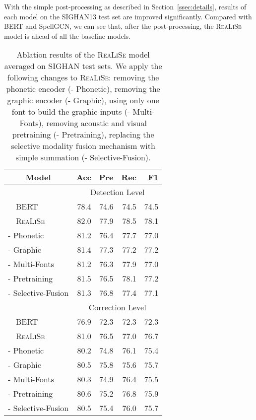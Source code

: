 \documentclass[11pt,a4paper]{article}
\newcommand\model{\textsc{ReaLiSe}}
\begin{document}
\begin{CJK*}{UTF8}{gbsn}

With the simple post-processing as described in Section~\ref{ssec:details}, results of each model on the SIGHAN13 test set are improved significantly. Compared with BERT and SpellGCN, we can see that, after the post-processing, the \model{} model is ahead of all the baseline models.

\end{CJK*}



\begin{table}[t]
\small
\centering

\begin{tabular}{@{}l|rrrr@{}}
\toprule
\multicolumn{1}{c|}{Model} & Acc & Pre & Rec & F1 \\
\midrule
& \multicolumn{4}{c}{Detection Level} \\
\midrule
~~BERT & 78.4 & 74.6 & 74.5 & 74.5 \\
~~\model{} & 82.0 & 77.9 & 78.5 & 78.1 \\
\quad - Phonetic & 81.2 & 76.4 & 77.7 & 77.0 \\
\quad - Graphic & 81.4 & 77.3 & 77.2 & 77.2 \\
\quad - Multi-Fonts & 81.2 & 76.3 & 77.9 & 77.0 \\
\quad - Pretraining & 81.5 & 76.5 & 78.1 & 77.2 \\
\quad - Selective-Fusion & 81.3 & 76.8 & 77.4 & 77.1 \\ 
\midrule
& \multicolumn{4}{c}{Correction Level} \\
\midrule
~~BERT & 76.9 & 72.3 & 72.3 & 72.3 \\
~~\model{} & 81.0 & 76.5 & 77.0 & 76.7 \\
\quad - Phonetic & 80.2 & 74.8 & 76.1 & 75.4 \\
\quad - Graphic & 80.5 & 75.8 & 75.6 & 75.7 \\
\quad - Multi-Fonts & 80.3 & 74.9 & 76.4 & 75.5 \\
\quad - Pretraining & 80.6 & 75.2 & 76.8 & 75.9 \\
\quad - Selective-Fusion & 80.5 & 75.4 & 76.0 & 75.7 \\ 
\bottomrule
\end{tabular}

\caption{Ablation results of the \model{} model averaged on SIGHAN test sets. We apply the following changes to \model{}: removing the phonetic encoder (- Phonetic), removing the graphic encoder (- Graphic),  using only one font to build the graphic inputs (- Multi-Fonts), removing acoustic and visual pretraining (- Pretraining), replacing the selective modality fusion mechanism with simple summation (- Selective-Fusion).}
\label{tab:ablation}
\end{table} 
\end{document}
